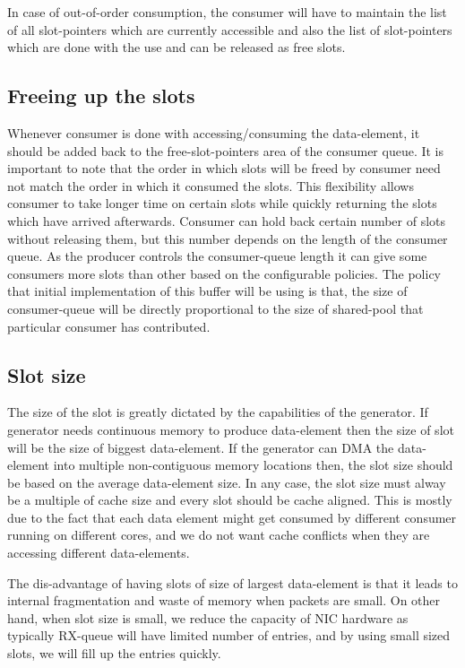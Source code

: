 \documentclass[a4paper,twoside]{report} %
\begin{document}
In case of out-of-order consumption, the consumer will have to
maintain the list of all slot-pointers which are currently accessible
and also the list of slot-pointers which are done with the use and can
be released as free slots.

\subsection{Freeing up the slots}
Whenever consumer is done with accessing/consuming the data-element,
it should be added back to the free-slot-pointers area of the consumer 
queue.  It is important to note that the order in which slots will be
freed by consumer need not match the order in which it consumed the
slots.  This flexibility allows consumer to take longer time on
certain slots while quickly returning the slots which have arrived
afterwards.  Consumer can hold back certain number of slots without
releasing them, but this number depends on the length of the consumer
queue.  As the producer controls the consumer-queue length it can give
some consumers more slots than other based on the configurable
policies.  The policy that initial implementation of this buffer will
be using is that, the size of consumer-queue will be directly
proportional to the size of shared-pool that particular consumer has
contributed.

\subsection{Slot size}
\label{sec:slotsize}
The size of the slot is greatly dictated by the capabilities of the
generator.  If generator needs
continuous memory to produce data-element then the size of
slot will be the size of biggest data-element.  If the
generator can DMA the data-element into multiple non-contiguous
memory locations then, the slot size should be based on
the average data-element size.  In any case, the slot size
must alway be a multiple of cache size and every slot should
be cache aligned.  This is mostly due to the fact that each
data element might get consumed by different consumer running
on different cores, and we do not want cache conflicts when
they are accessing different data-elements.


The dis-advantage of having slots of size of largest data-element
is that it leads to internal fragmentation and waste of memory 
when packets are small.  On other hand, when slot size is small,
we reduce the capacity of NIC hardware as typically RX-queue
will have limited number of entries, and by using small sized
slots, we will fill up the entries quickly.
\end{document}
